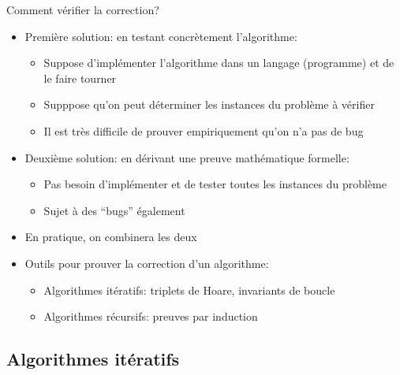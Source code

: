 \begin{frame}{Comment vérifier la correction?}
\begin{itemize}
\item Première solution: en \alert{testant} concrètement l'algorithme:
\begin{itemize}
\item Suppose d'implémenter l'algorithme dans un langage (programme)
  et de le faire tourner
\item Supppose qu'on peut déterminer les instances du problème à vérifier
\item Il est très difficile de prouver empiriquement qu'on n'a pas de bug %
\end{itemize}
\item Deuxième solution: en dérivant une \alert{preuve mathématique} formelle:
\begin{itemize}
\item Pas besoin d'implémenter et de tester toutes les instances du problème
\item Sujet à des ``bugs'' également
\end{itemize}
\item En pratique, on combinera les deux

\bigskip

\item Outils pour prouver la correction d'un algorithme:
\begin{itemize}
\item Algorithmes itératifs: triplets de Hoare, invariants de boucle%
\item Algorithmes récursifs: preuves par induction
\end{itemize}
\end{itemize}
\end{frame}

\subsection{Algorithmes itératifs}

